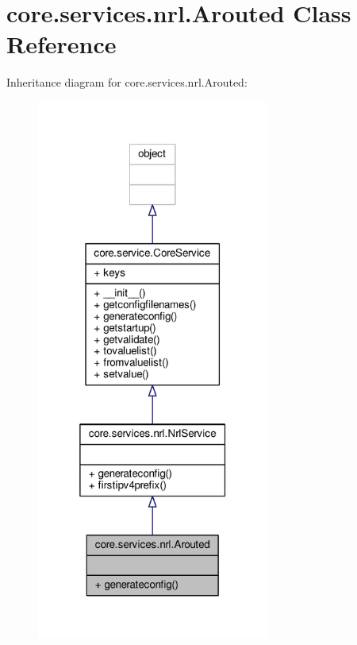 \hypertarget{classcore_1_1services_1_1nrl_1_1_arouted}{\section{core.\+services.\+nrl.\+Arouted Class Reference}
\label{classcore_1_1services_1_1nrl_1_1_arouted}
}


Inheritance diagram for core.\+services.\+nrl.\+Arouted\+:
\nopagebreak
\begin{figure}[H]
\begin{center}
\leavevmode
\includegraphics[width=217pt]{classcore_1_1services_1_1nrl_1_1_arouted__inherit__graph}
\end{center}
\end{figure}


